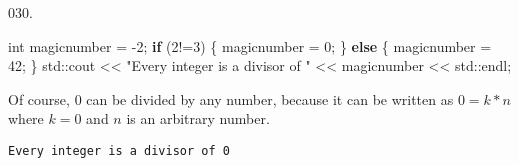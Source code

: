 \documentclass[]{book}
\newenvironment{Shaded}{}{}
\newcommand{\BuiltInTok}[1]{#1}
\newcommand{\ControlFlowTok}[1]{\textcolor[rgb]{0.00,0.44,0.13}{\textbf{#1}}}
\newcommand{\DataTypeTok}[1]{\textcolor[rgb]{0.56,0.13,0.00}{#1}}
\newcommand{\DecValTok}[1]{\textcolor[rgb]{0.25,0.63,0.44}{#1}}
\newcommand{\NormalTok}[1]{#1}
\newcommand{\StringTok}[1]{\textcolor[rgb]{0.25,0.44,0.63}{#1}}
\begin{document}
\vspace{2mm}\noindent\hrulefill{}

\begin{minipage}{\linewidth}\noindent
{\tiny 030.}\\
\begin{minipage}[t]{.485\linewidth}

\begin{framed}

\begin{Shaded}
\begin{Highlighting}[]
\DataTypeTok{int}\NormalTok{ magicnumber = }\DecValTok{-2}\NormalTok{;}
\ControlFlowTok{if}\NormalTok{ (}\DecValTok{2}\NormalTok{!=}\DecValTok{3}\NormalTok{) \{}
\NormalTok{  magicnumber = }\DecValTok{0}\NormalTok{;}
\NormalTok{\} }\ControlFlowTok{else}\NormalTok{ \{}
\NormalTok{  magicnumber = }\DecValTok{42}\NormalTok{;}
\NormalTok{\}}
\BuiltInTok{std::}\NormalTok{cout << }\StringTok{"Every integer is a divisor of "}
\NormalTok{          << magicnumber << }\BuiltInTok{std::}\NormalTok{endl;}
\end{Highlighting}
\end{Shaded}

\end{framed}

\end{minipage}
\hfill
\begin{minipage}[t]{.485\linewidth}

Of course, \(0\) can be divided by any number, because it can be written
as \(0 = k*n\) where \(k=0\) and \(n\) is an arbitrary number.

\begin{framed}

\begin{verbatim}
Every integer is a divisor of 0
\end{verbatim}

\end{framed}

\end{minipage}
\end{minipage}

\vspace{2mm}\noindent\hrulefill{}
\end{document}
